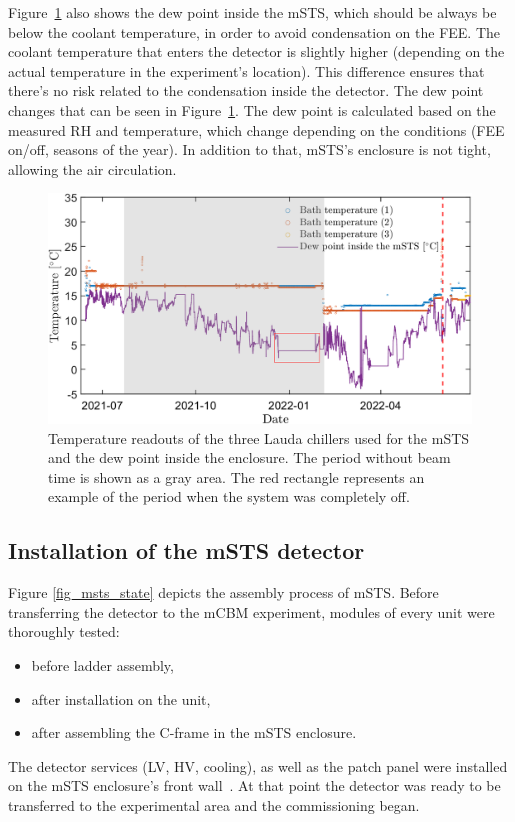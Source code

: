 Figure~\ref{fig_cooling} also shows the dew point inside the \gls{mSTS}, which should be always be below the coolant temperature, in order to avoid condensation on the \gls{FEE}. The coolant temperature that enters the detector is slightly higher (depending on the actual temperature in the experiment's location). This difference ensures that there's no risk related to the condensation inside the detector. The dew point changes that can be seen in Figure~\ref{fig_cooling}. The dew point is calculated based on the measured \gls{RH} and temperature, which change depending on the conditions (\gls{FEE} on/off, seasons of the year). In addition to that, \gls{mSTS}'s enclosure is not tight,  allowing the air circulation.
\begin{figure}[!h]
\centering
\includegraphics[width=0.95\columnwidth]{Chapter6/DCS/images/cooling.png}
\caption{Temperature readouts of the three Lauda chillers used for the \gls{mSTS} and the dew point inside the enclosure. The period without beam time is shown as a gray area. The red rectangle represents an example of the period when the system was completely off.}
\label{fig_cooling}
\end{figure}

\subsection{Installation of the mSTS detector}
Figure \ref{fig_msts_state} depicts the assembly process of \gls{mSTS}. Before transferring the detector to the \gls{mCBM} experiment, modules of every unit were thoroughly tested:
\begin{itemize}
    \item before ladder assembly,
    \item after installation on the unit,
    \item after assembling the C-frame in the mSTS enclosure.
\end{itemize}
The detector services (\gls{LV}, \gls{HV}, cooling), as well as the patch panel were installed on the \gls{mSTS} enclosure's front wall~\cite{tekli1}. At that point the detector was ready to be transferred to the experimental area and the commissioning began.

